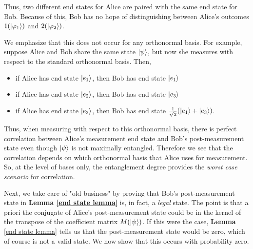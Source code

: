 \begin{example}
Thus, two different end states for Alice are paired with the same end state for Bob.  Because of this, Bob has no hope of distinguishing between Alice's outcomes $1 (\ket{\varphi_1})$ and $2(\ket{\varphi_2})$.
\end{example} 
We emphasize that this does not occur for any orthonormal basis. For example, suppose Alice and Bob share the same state $\ket{\psi}$, but now she measures with respect to the standard orthonormal basis.  Then,

\begin{itemize}
\item if Alice has end state $\ket{e_1}$, then Bob has end state $\ket{e_1}$
\item if Alice has end state $\ket{e_2}$, then Bob has end state $\ket{e_3}$
\item if Alice has end state $\ket{e_3}$, then Bob has end state  $\frac{1}{\sqrt{2}}(\ket{e_1}+\ket{e_3})$.
\end{itemize}
Thus, when measuring with respect to this orthonormal basis, there is perfect correlation between Alice's measurement end state and Bob's post-measurement state even though $\ket{\psi}$ is not maximally entangled.  Therefore we see that the correlation depends on which orthonormal basis that Alice uses for measurement. So, at the level of bases only, the entanglement degree provides the \textit{worst case scenario} for correlation.











Next, we take care of "old business" by proving that Bob's post-measurement state in \textbf{Lemma \ref{end state lemma}} is, in fact, a {\emph{legal}} state.  The point is that a priori the conjugate of Alice's post-measurement state could be in the kernel of the transpose of the coefficient matrix $M(\ket{\psi})$. If this were the case, {\bf{Lemma}} \ref{end state lemma} tells us that the post-measurement state would be zero, which of course is not a valid state.  We now show that this occurs with probability zero.

